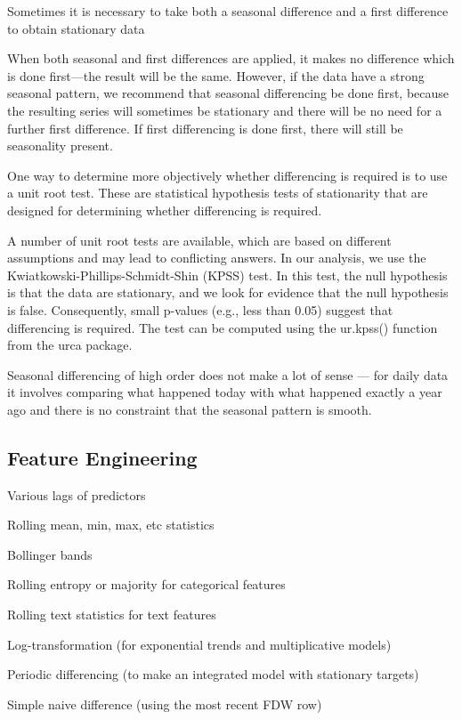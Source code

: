 \documentclass[]{book}
\begin{document}
Sometimes it is necessary to take both a seasonal difference and a first difference to obtain stationary data

When both seasonal and first differences are applied, it makes no difference which is done first---the result will be the same. However, if the data have a strong seasonal pattern, we recommend that seasonal differencing be done first, because the resulting series will sometimes be stationary and there will be no need for a further first difference. If first differencing is done first, there will still be seasonality present.

One way to determine more objectively whether differencing is required is to use a unit root test. These are statistical hypothesis tests of stationarity that are designed for determining whether differencing is required.

A number of unit root tests are available, which are based on different assumptions and may lead to conflicting answers. In our analysis, we use the Kwiatkowski-Phillips-Schmidt-Shin (KPSS) test. In this test, the null hypothesis is that the data are stationary, and we look for evidence that the null hypothesis is false. Consequently, small p-values (e.g., less than 0.05) suggest that differencing is required. The test can be computed using the ur.kpss() function from the urca package.

Seasonal differencing of high order does not make a lot of sense --- for daily data it involves comparing what happened today with what happened exactly a year ago and there is no constraint that the seasonal pattern is smooth.

\hypertarget{feature-engineering-1}{%
\subsection{Feature Engineering}\label{feature-engineering-1}}

Various lags of predictors

Rolling mean, min, max, etc statistics

Bollinger bands

Rolling entropy or majority for categorical features

Rolling text statistics for text features

Log-transformation (for exponential trends and multiplicative models)

Periodic differencing (to make an integrated model with stationary targets)

Simple naive difference (using the most recent FDW row)
\end{document}
